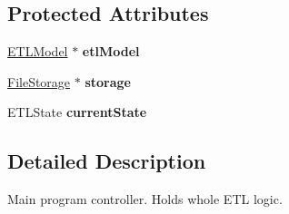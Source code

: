 \subsection*{Protected Attributes}
\begin{DoxyCompactItemize}
\item 
\hypertarget{interface_e_t_l_controller_a554544ba1c9186a7bb73757b427b3c39}{\hyperlink{interface_e_t_l_model}{E\-T\-L\-Model} $\ast$ {\bfseries etl\-Model}}\label{interface_e_t_l_controller_a554544ba1c9186a7bb73757b427b3c39}

\item 
\hypertarget{interface_e_t_l_controller_a15381ef714c5a58e3beab18f215f1779}{\hyperlink{interface_file_storage}{File\-Storage} $\ast$ {\bfseries storage}}\label{interface_e_t_l_controller_a15381ef714c5a58e3beab18f215f1779}

\item 
\hypertarget{interface_e_t_l_controller_aad93dd7dfbf225b84da837b1a8574b0b}{E\-T\-L\-State {\bfseries current\-State}}\label{interface_e_t_l_controller_aad93dd7dfbf225b84da837b1a8574b0b}

\end{DoxyCompactItemize}


\subsection{Detailed Description}
Main program controller. Holds whole E\-T\-L logic. 

